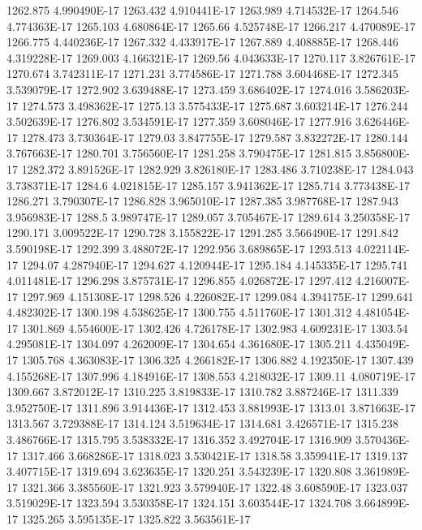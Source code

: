1262.875  4.990490E-17
1263.432  4.910441E-17
1263.989  4.714532E-17
1264.546  4.774363E-17
1265.103  4.680864E-17
1265.66  4.525748E-17
1266.217  4.470089E-17
1266.775  4.440236E-17
1267.332  4.433917E-17
1267.889  4.408885E-17
1268.446  4.319228E-17
1269.003  4.166321E-17
1269.56  4.043633E-17
1270.117  3.826761E-17
1270.674  3.742311E-17
1271.231  3.774586E-17
1271.788  3.604468E-17
1272.345  3.539079E-17
1272.902  3.639488E-17
1273.459  3.686402E-17
1274.016  3.586203E-17
1274.573  3.498362E-17
1275.13  3.575433E-17
1275.687  3.603214E-17
1276.244  3.502639E-17
1276.802  3.534591E-17
1277.359  3.608046E-17
1277.916  3.626446E-17
1278.473  3.730364E-17
1279.03  3.847755E-17
1279.587  3.832272E-17
1280.144  3.767663E-17
1280.701  3.756560E-17
1281.258  3.790475E-17
1281.815  3.856800E-17
1282.372  3.891526E-17
1282.929  3.826180E-17
1283.486  3.710238E-17
1284.043  3.738371E-17
1284.6  4.021815E-17
1285.157  3.941362E-17
1285.714  3.773438E-17
1286.271  3.790307E-17
1286.828  3.965010E-17
1287.385  3.987768E-17
1287.943  3.956983E-17
1288.5  3.989747E-17
1289.057  3.705467E-17
1289.614  3.250358E-17
1290.171  3.009522E-17
1290.728  3.155822E-17
1291.285  3.566490E-17
1291.842  3.590198E-17
1292.399  3.488072E-17
1292.956  3.689865E-17
1293.513  4.022114E-17
1294.07  4.287940E-17
1294.627  4.120944E-17
1295.184  4.145335E-17
1295.741  4.011481E-17
1296.298  3.875731E-17
1296.855  4.026872E-17
1297.412  4.216007E-17
1297.969  4.151308E-17
1298.526  4.226082E-17
1299.084  4.394175E-17
1299.641  4.482302E-17
1300.198  4.538625E-17
1300.755  4.511760E-17
1301.312  4.481054E-17
1301.869  4.554600E-17
1302.426  4.726178E-17
1302.983  4.609231E-17
1303.54  4.295081E-17
1304.097  4.262009E-17
1304.654  4.361680E-17
1305.211  4.435049E-17
1305.768  4.363083E-17
1306.325  4.266182E-17
1306.882  4.192350E-17
1307.439  4.155268E-17
1307.996  4.184916E-17
1308.553  4.218032E-17
1309.11  4.080719E-17
1309.667  3.872012E-17
1310.225  3.819833E-17
1310.782  3.887246E-17
1311.339  3.952750E-17
1311.896  3.914436E-17
1312.453  3.881993E-17
1313.01  3.871663E-17
1313.567  3.729388E-17
1314.124  3.519634E-17
1314.681  3.426571E-17
1315.238  3.486766E-17
1315.795  3.538332E-17
1316.352  3.492704E-17
1316.909  3.570436E-17
1317.466  3.668286E-17
1318.023  3.530421E-17
1318.58  3.359941E-17
1319.137  3.407715E-17
1319.694  3.623635E-17
1320.251  3.543239E-17
1320.808  3.361989E-17
1321.366  3.385560E-17
1321.923  3.579940E-17
1322.48  3.608590E-17
1323.037  3.519029E-17
1323.594  3.530358E-17
1324.151  3.603544E-17
1324.708  3.664899E-17
1325.265  3.595135E-17
1325.822  3.563561E-17
